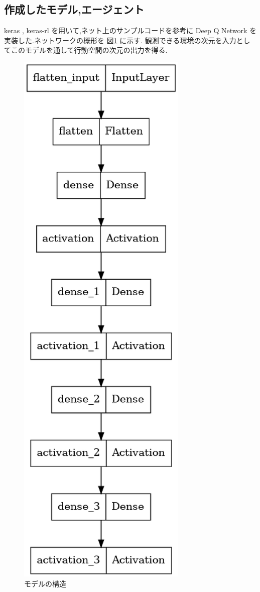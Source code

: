 \documentclass{jarticle}     %
\begin{document}
\subsection{作成したモデル,エージェント}
keras , keras-rl を用いて,ネット上のサンプルコード\cite{DQNcode}を参考に Deep Q Network を実装した.ネットワークの概形を 図\ref{fig:model} に示す.
観測できる環境の次元を入力としてこのモデルを通して行動空間の次元の出力を得る.\par

\begin{figure}
  \centering
  \includegraphics[scale=0.4]{assets/model.eps}
  \caption{モデルの構造}
  \label{fig:model}
\end{figure}
\end{document}
